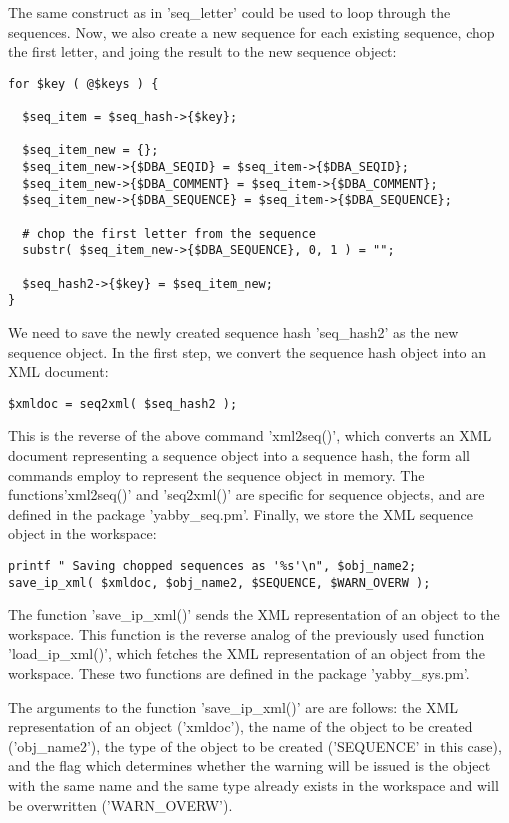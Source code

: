 The same construct as in 'seq\_letter' could be used to loop through
the sequences. Now, we also create a new sequence for each existing
sequence, chop the first letter, and joing the result to the new
sequence object:

\begin{verbatim}
for $key ( @$keys ) {

  $seq_item = $seq_hash->{$key};

  $seq_item_new = {};
  $seq_item_new->{$DBA_SEQID} = $seq_item->{$DBA_SEQID};
  $seq_item_new->{$DBA_COMMENT} = $seq_item->{$DBA_COMMENT};
  $seq_item_new->{$DBA_SEQUENCE} = $seq_item->{$DBA_SEQUENCE};

  # chop the first letter from the sequence
  substr( $seq_item_new->{$DBA_SEQUENCE}, 0, 1 ) = "";

  $seq_hash2->{$key} = $seq_item_new;
}
\end{verbatim}

We need to save the newly created sequence hash 'seq\_hash2' as the
new sequence object. In the first step, we convert the sequence hash
object into an XML document:

\begin{verbatim}
$xmldoc = seq2xml( $seq_hash2 );
\end{verbatim}

This is the reverse of the above command 'xml2seq()', which converts
an XML document representing a sequence object into a sequence hash,
the form all commands employ to represent the sequence object in
memory.  The functions'xml2seq()' and 'seq2xml()' are specific for
sequence objects, and are defined in the package 'yabby\_seq.pm'.
Finally, we store the XML sequence object in the workspace:

\begin{verbatim}
printf " Saving chopped sequences as '%s'\n", $obj_name2;
save_ip_xml( $xmldoc, $obj_name2, $SEQUENCE, $WARN_OVERW );
\end{verbatim}

The function 'save\_ip\_xml()' sends the XML representation of an
object to the workspace. This function is the reverse analog of
the previously used function 'load\_ip\_xml()', which fetches the
XML representation of an object from the workspace. These two
functions are defined in the package 'yabby\_sys.pm'.

The arguments to the function 'save\_ip\_xml()' are are follows:
the XML representation of an object ('xmldoc'), the name of the
object to be created ('obj\_name2'), the type of the object to be
created ('SEQUENCE' in this case), and the flag which determines
whether the warning will be issued is the object with the same
name and the same type already exists in the workspace and will
be overwritten ('WARN\_OVERW').

